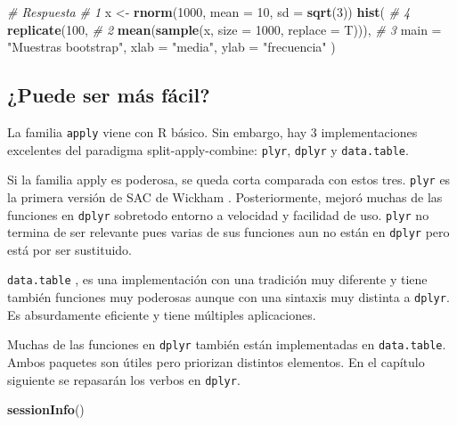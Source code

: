 \documentclass[]{article}
\newenvironment{Shaded}{\begin{snugshade}}{\end{snugshade}}
\newcommand{\KeywordTok}[1]{\textcolor[rgb]{0.13,0.29,0.53}{\textbf{#1}}}
\newcommand{\DataTypeTok}[1]{\textcolor[rgb]{0.13,0.29,0.53}{#1}}
\newcommand{\DecValTok}[1]{\textcolor[rgb]{0.00,0.00,0.81}{#1}}
\newcommand{\StringTok}[1]{\textcolor[rgb]{0.31,0.60,0.02}{#1}}
\newcommand{\CommentTok}[1]{\textcolor[rgb]{0.56,0.35,0.01}{\textit{#1}}}
\newcommand{\NormalTok}[1]{#1}
\begin{document}
\begin{Shaded}
\begin{Highlighting}[]
\CommentTok{# Respuesta}
\CommentTok{# 1}
\NormalTok{x <-}\StringTok{ }\KeywordTok{rnorm}\NormalTok{(}\DecValTok{1000}\NormalTok{, }\DataTypeTok{mean =} \DecValTok{10}\NormalTok{, }\DataTypeTok{sd =} \KeywordTok{sqrt}\NormalTok{(}\DecValTok{3}\NormalTok{))}
\KeywordTok{hist}\NormalTok{( }\CommentTok{# 4}
  \KeywordTok{replicate}\NormalTok{(}\DecValTok{100}\NormalTok{, }\CommentTok{# 2}
            \KeywordTok{mean}\NormalTok{(}\KeywordTok{sample}\NormalTok{(x, }\DataTypeTok{size =} \DecValTok{1000}\NormalTok{, }\DataTypeTok{replace =}\NormalTok{ T))), }\CommentTok{# 3}
  \DataTypeTok{main =} \StringTok{"Muestras bootstrap"}\NormalTok{,}
  \DataTypeTok{xlab =} \StringTok{"media"}\NormalTok{,}
  \DataTypeTok{ylab =} \StringTok{"frecuencia"}
\NormalTok{)}
\end{Highlighting}
\end{Shaded}

\subsection{¿Puede ser más fácil?}\label{puede-ser-mas-facil}

La familia \texttt{apply} viene con R básico. Sin embargo, hay 3
implementaciones excelentes del paradigma split-apply-combine:
\texttt{plyr}, \texttt{dplyr} y \texttt{data.table}.

Si la familia apply es poderosa, se queda corta comparada con estos
tres. \texttt{plyr} es la primera versión de SAC de Wickham
\parencite{wickham2011split}. Posteriormente, mejoró muchas de las
funciones en \texttt{dplyr} \parencite{dplyr} sobretodo entorno a
velocidad y facilidad de uso. \texttt{plyr} no termina de ser relevante
pues varias de sus funciones aun no están en \texttt{dplyr} pero está
por ser sustituido.

\texttt{data.table} \parencite{datatable}, es una implementación con una
tradición muy diferente y tiene también funciones muy poderosas aunque
con una sintaxis muy distinta a \texttt{dplyr}. Es absurdamente
eficiente y tiene múltiples aplicaciones.

Muchas de las funciones en \texttt{dplyr} también están implementadas en
\texttt{data.table}. Ambos paquetes son útiles pero priorizan distintos
elementos. En el capítulo siguiente se repasarán los verbos en
\texttt{dplyr}.

\begin{Shaded}
\begin{Highlighting}[]
\KeywordTok{sessionInfo}\NormalTok{()}
\end{Highlighting}
\end{Shaded}
\end{document}
